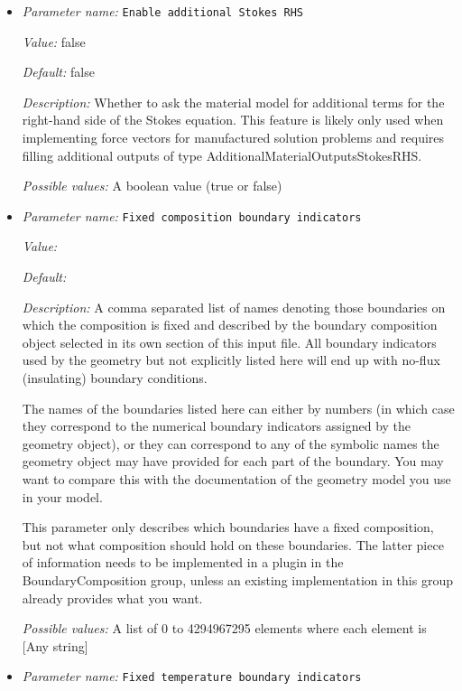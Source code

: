 \begin{itemize}
\item {\it Parameter name:} {\tt Enable additional Stokes RHS}
\label{parameters:Model settings/Enable additional Stokes RHS}


{\it Value:} false


{\it Default:} false


{\it Description:} Whether to ask the material model for additional terms for the right-hand side of the Stokes equation. This feature is likely only used when implementing force vectors for manufactured solution problems and requires filling additional outputs of type AdditionalMaterialOutputsStokesRHS.


{\it Possible values:} A boolean value (true or false)
\item {\it Parameter name:} {\tt Fixed composition boundary indicators}
\label{parameters:Model settings/Fixed composition boundary indicators}


{\it Value:} 


{\it Default:} 


{\it Description:} A comma separated list of names denoting those boundaries on which the composition is fixed and described by the boundary composition object selected in its own section of this input file. All boundary indicators used by the geometry but not explicitly listed here will end up with no-flux (insulating) boundary conditions.

The names of the boundaries listed here can either by numbers (in which case they correspond to the numerical boundary indicators assigned by the geometry object), or they can correspond to any of the symbolic names the geometry object may have provided for each part of the boundary. You may want to compare this with the documentation of the geometry model you use in your model.

This parameter only describes which boundaries have a fixed composition, but not what composition should hold on these boundaries. The latter piece of information needs to be implemented in a plugin in the BoundaryComposition group, unless an existing implementation in this group already provides what you want.


{\it Possible values:} A list of 0 to 4294967295 elements where each element is [Any string]
\item {\it Parameter name:} {\tt Fixed temperature boundary indicators}
\label{parameters:Model settings/Fixed temperature boundary indicators}



\end{itemize}
